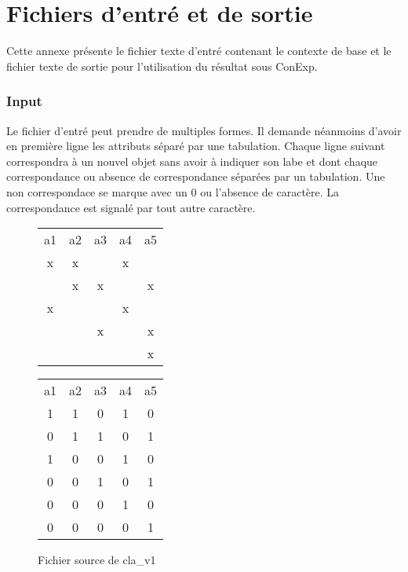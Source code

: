 \chapter{Fichiers d'entré et de sortie}
\label{inputoutput}

Cette annexe présente le fichier texte d'entré contenant le contexte de base et le fichier texte de sortie pour l'utilisation du résultat sous ConExp.

\subsection*{Input}

Le fichier d'entré peut prendre de multiples formes. Il demande néanmoins d'avoir en première ligne les attributs séparé par une tabulation. Chaque ligne suivant correspondra à un nouvel objet sans avoir à indiquer son labe et dont chaque correspondance ou absence de correspondance séparées par un tabulation. Une non correspondace se marque avec un \guillemotleft{} 0 \guillemotright{} ou l'absence de caractère. La correspondance est signalé par tout autre caractère.

\begin{figure}[H]
	\begin{minipage}[c]{0.5\textwidth}
	\begin{center}
		\begin{tabular}{ c c c c c }
			a1 & a2 & a3 & a4 & a5 \\
			x & x & & x & \\
			 & x & x & & x\\
			x & & & x & \\
			 & & x & & x \\
			 & & & & x \\
		\end{tabular}
	\end{center}
	\end{minipage}
	\begin{minipage}[c]{0.5\textwidth}
	\begin{center}
		\begin{tabular}{ c c c c c }
			a1 & a2 & a3 & a4 & a5 \\
			1 & 1 & 0 & 1 & 0 \\
			0 & 1 & 1 & 0 & 1 \\
			1 & 0 & 0 & 1 & 0 \\
			0 & 0 & 1 & 0 & 1 \\
			0 & 0 & 0 & 1 & 0 \\
			0 & 0 & 0 & 0 & 1 \\
		\end{tabular}
	\end{center}
	\end{minipage}
	\caption{Fichier source de cla\_v1}
\end{figure}

